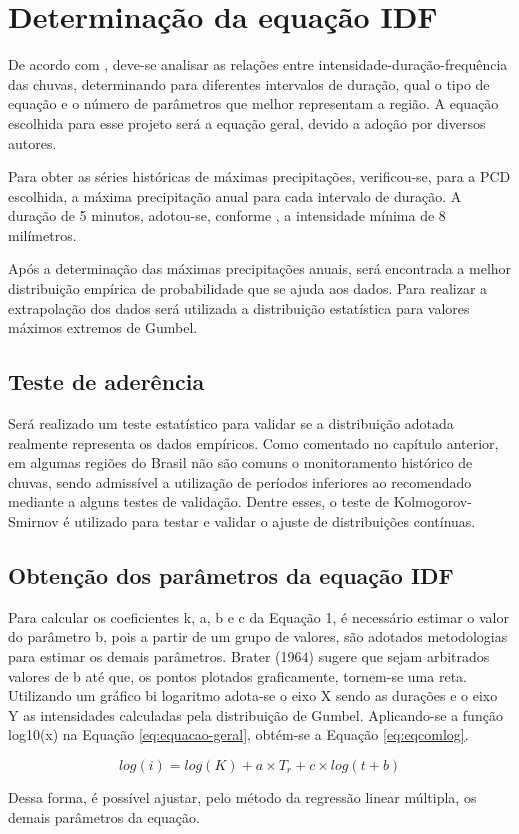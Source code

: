 \section{Determinação da equação IDF}

De acordo com , deve-se analisar as relações entre intensidade-duração-frequência das chuvas, determinando para diferentes intervalos de duração, qual o tipo de equação e o número de parâmetros que melhor representam a região. A equação escolhida para esse projeto será a equação geral, devido a adoção por diversos autores.

Para obter as séries históricas de máximas precipitações, verificou-se, para a PCD escolhida, a máxima precipitação anual para cada intervalo de duração. A duração de 5 minutos, adotou-se, conforme \cite{mudancas-climaticas}, a intensidade mínima de 8 milímetros.

Após a determinação das máximas precipitações anuais, será encontrada a melhor distribuição empírica de probabilidade que se ajuda aos dados.
Para realizar a extrapolação dos dados será utilizada a distribuição estatística para valores máximos extremos de Gumbel.

\subsection{Teste de aderência}

Será realizado um teste estatístico para validar se a distribuição adotada realmente representa os dados empíricos. Como comentado no capítulo anterior, em algumas regiões do Brasil não são comuns o monitoramento histórico de chuvas, sendo admissível a utilização de períodos inferiores ao recomendado mediante a alguns testes de validação. Dentre esses, o teste de Kolmogorov-Smirnov é utilizado para testar e validar o ajuste de distribuições contínuas.

\subsection{Obtenção dos parâmetros da equação IDF}

Para calcular os coeficientes k, a, b e c da Equação 1, é necessário estimar o valor do parâmetro b, pois a partir de um grupo de valores, são adotados metodologias para estimar os demais parâmetros. Brater (1964) sugere que sejam arbitrados valores de b até que, os pontos plotados graficamente, tornem-se uma reta. Utilizando um gráfico bi logaritmo adota-se o eixo X sendo as durações e o eixo Y as intensidades calculadas pela distribuição de Gumbel.
Aplicando-se a função log10(x) na Equação \ref{eq:equacao-geral}, obtém-se a Equação \ref{eq:eqcomlog}.

\begin{equation}
\label{eq:eqcomlog}
    log(i) = log(K) + a \times T_r + c \times log(t+b)
\end{equation}

Dessa forma, é possível ajustar, pelo método da regressão linear múltipla, os demais parâmetros da equação.
